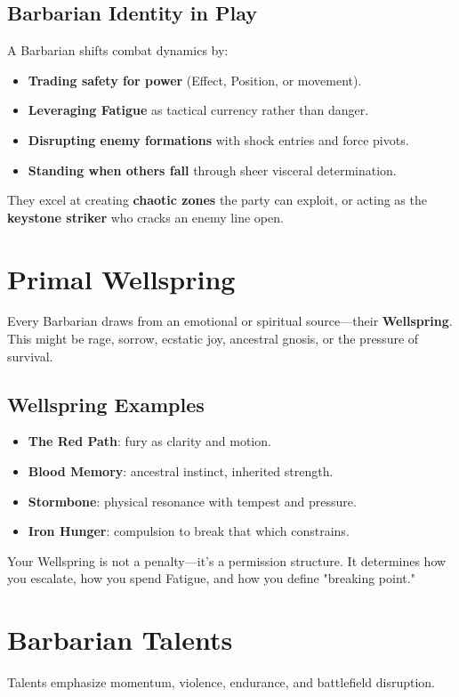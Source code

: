 \documentclass[11pt]{book}
\begin{document}
\subsection{Barbarian Identity in Play}
A Barbarian shifts combat dynamics by:
\begin{itemize}
  \item \textbf{Trading safety for power} (Effect, Position, or movement).
  \item \textbf{Leveraging Fatigue} as tactical currency rather than danger.
  \item \textbf{Disrupting enemy formations} with shock entries and force pivots.
  \item \textbf{Standing when others fall} through sheer visceral determination.
\end{itemize}

They excel at creating \textbf{chaotic zones} the party can exploit, or acting as the
\textbf{keystone striker} who cracks an enemy line open.

\section{Primal Wellspring}
Every Barbarian draws from an emotional or spiritual source---their \textbf{Wellspring}.
This might be rage, sorrow, ecstatic joy, ancestral gnosis, or the pressure of survival.

\subsection{Wellspring Examples}
\begin{itemize}
  \item \textbf{The Red Path}: fury as clarity and motion.
  \item \textbf{Blood Memory}: ancestral instinct, inherited strength.
  \item \textbf{Stormbone}: physical resonance with tempest and pressure.
  \item \textbf{Iron Hunger}: compulsion to break that which constrains.
\end{itemize}

Your Wellspring is not a penalty---it's a permission structure.  
It determines how you escalate, how you spend Fatigue, and how you define "breaking point."

\section{Barbarian Talents}
Talents emphasize momentum, violence, endurance, and battlefield disruption.
\end{document}
